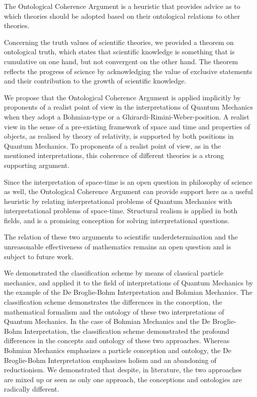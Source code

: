 \documentclass{article}
\begin{document}
The Ontological Coherence Argument is a heuristic that provides advice as to which theories should be adopted based on their ontological relations to other theories.  \newline

Concerning the truth values of scientific theories, we provided a theorem on ontological truth, which states that scientific knowledge is something that is cumulative on one hand, but not convergent on the other hand. The theorem reflects the progress of science by acknowledging the value of exclusive statements and their contribution to the growth of scientific knowledge. \newline

We propose that the Ontological Coherence Argument is applied implicitly by proponents of a realist point of view in the interpretations of Quantum Mechanics when they adopt a Bohmian-type or a Ghirardi-Rimini-Weber-position. A realist view in the sense of a pre-existing framework of space and time and properties of objects, as realised by theory of relativity, is supported by both positions in Quantum Mechanics. To proponents of a realist point of view, as in the mentioned interpretations, this coherence of different theories is a strong supporting argument. 

Since the interpretation of space-time is an open question in philosophy of science as well, the Ontological Coherence Argument can provide support here as a useful heuristic by relating interpretational problems of Quantum Mechanics with interpretational problems of space-time. Structural realism is applied in both fields, and is a promising conception for solving interpretational questions. \newline

The relation of these two arguments to scientific underdetermination and the unreasonable effectiveness of mathematics remains an open question and is subject to future work. \newline



 
We demonstrated the classification scheme by means of classical particle mechanics, and applied it to the field of interpretations of Quantum Mechanics by the example of the De Broglie-Bohm Interpretation and Bohmian Mechanics. The classification scheme demonstrates the differences in the conception, the mathematical formalism and the ontology of these two interpretations of Quantum Mechanics. In the case of Bohmian Mechanics and the De Broglie-Bohm Interpretation, the classification scheme demonstrated the profound differences in the concepts and ontology of these two approaches. Whereas Bohmian Mechanics emphasizes a particle conception and ontology, the De Broglie-Bohm Interpretation emphasizes holism and an abandoning of reductionism. We demonstrated that despite, in literature, the two approaches are mixed up or seen as only one approach, the conceptions and ontologies are radically different. \newline
\end{document}
